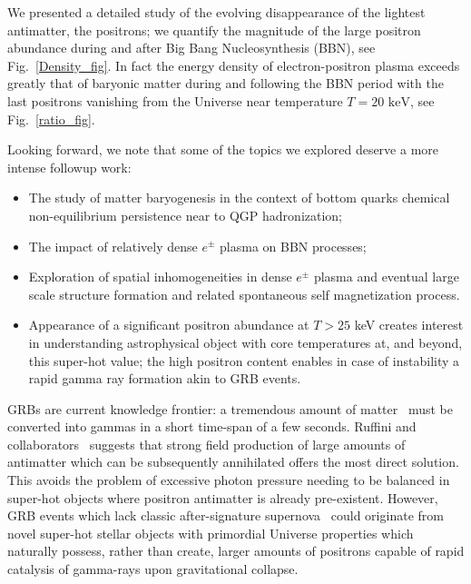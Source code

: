 \documentclass[universe,article,submit,moreauthors,pdftex,a4paper]{Definitions/mdpi}
\newcommand{\keV}{\text{ keV}}
\newcommand*{\rf}[1]{Fig.~{\ref{#1}}}
\begin{document}
We presented a detailed study of the evolving disappearance of the lightest antimatter, the positrons; we quantify the magnitude of the large positron abundance during and after Big Bang Nucleosynthesis (BBN), see \rf{Density_fig}. In fact the energy density of electron-positron plasma exceeds greatly that of baryonic matter during and following the BBN period with the last positrons vanishing from the Universe near temperature $T=20\keV$, see \rf{ratio_fig}. 

Looking forward, we note that some of the topics we explored deserve a more intense followup work: \\[-0.7cm]
\begin{itemize}
 \item The study of matter baryogenesis in the context of bottom quarks chemical non-equilibrium persistence near to QGP hadronization;
 \item The impact of relatively dense $e^{\pm}$ plasma on BBN processes;
 \item Exploration of spatial inhomogeneities in dense $e^{\pm}$ plasma and eventual large scale structure formation and related spontaneous self magnetization process. 
 \item Appearance of a significant positron abundance at $T>25$ keV creates interest in understanding astrophysical object with core temperatures at, and beyond, this super-hot value; the high positron content enables in case of instability a rapid gamma ray formation akin to GRB events. 
\end{itemize}

GRBs are current knowledge frontier:  a tremendous amount of matter~\cite{Aksenov:2010vi} must be converted into gammas in a short time-span of a few seconds. Ruffini and collaborators~\cite{Ruffini:2001fe,Ruffini:2003yt,Ruffini:2009hg,Aksenov:2008zz,Ruffini:2012it,Han:2011er} suggests that strong field production of large amounts of antimatter which can be subsequently annihilated offers the most direct solution. This avoids the problem of excessive photon pressure needing to be balanced in super-hot objects where positron antimatter is already pre-existent. However, GRB events which lack classic  after-signature supernova~\cite{Burns:2023oxn,Levan:2023doz} could originate from novel super-hot stellar objects with primordial Universe properties which naturally possess, rather than create, larger amounts of positrons capable of rapid catalysis of gamma-rays upon gravitational collapse. 
\end{document}
